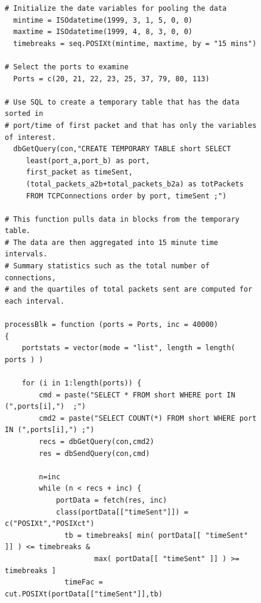 \begin{figure}

\begin{verbatim}
# Initialize the date variables for pooling the data
  mintime = ISOdatetime(1999, 3, 1, 5, 0, 0)
  maxtime = ISOdatetime(1999, 4, 8, 3, 0, 0)
  timebreaks = seq.POSIXt(mintime, maxtime, by = "15 mins")

# Select the ports to examine
  Ports = c(20, 21, 22, 23, 25, 37, 79, 80, 113)

# Use SQL to create a temporary table that has the data sorted in
# port/time of first packet and that has only the variables of interest.
  dbGetQuery(con,"CREATE TEMPORARY TABLE short SELECT
     least(port_a,port_b) as port, 
     first_packet as timeSent, 
     (total_packets_a2b+total_packets_b2a) as totPackets 
     FROM TCPConnections order by port, timeSent ;")

# This function pulls data in blocks from the temporary table.  
# The data are then aggregated into 15 minute time intervals.
# Summary statistics such as the total number of connections,
# and the quartiles of total packets sent are computed for each interval.

processBlk = function (ports = Ports, inc = 40000)
{
    portstats = vector(mode = "list", length = length( ports ) )

    for (i in 1:length(ports)) {
        cmd = paste("SELECT * FROM short WHERE port IN (",ports[i],")  ;")
        cmd2 = paste("SELECT COUNT(*) FROM short WHERE port IN (",ports[i],") ;")
        recs = dbGetQuery(con,cmd2)
        res = dbSendQuery(con,cmd)
        
        n=inc
        while (n < recs + inc) {
            portData = fetch(res, inc)
            class(portData[["timeSent"]]) = c("POSIXt","POSIXct")
              tb = timebreaks[ min( portData[[ "timeSent" ]] ) <= timebreaks &
                     max( portData[[ "timeSent" ]] ) >= timebreaks ]
              timeFac = cut.POSIXt(portData[["timeSent"]],tb)

\end{verbatim}
\end{figure}

